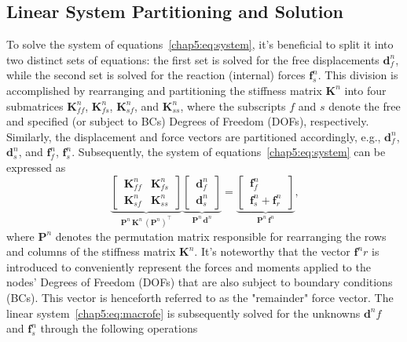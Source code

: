 \subsection{Linear System Partitioning and Solution}

To solve the system of equations~\eqref{chap5:eq:system}, it's beneficial to split it into two distinct sets of equations: the first set is solved for the free displacements $\mathbf{d}^{n}_{f}$, while the second set is solved for the reaction (internal) forces $\mathbf{f}^{n}_{s}$. This division is accomplished by rearranging and partitioning the stiffness matrix $\mathbf{K}^{n}$ into four submatrices $\mathbf{K}^{n}_{ff}$, $\mathbf{K}^{n}_{fs}$, $\mathbf{K}^{n}_{sf}$, and $\mathbf{K}^{n}_{ss}$, where the subscripts $f$ and $s$ denote the free and specified (or subject to \acp{BC}) Degrees of Freedom (\acp{DOF}), respectively. Similarly, the displacement and force vectors are partitioned accordingly, e.g., $\mathbf{d}^{n}_{f}$, $\mathbf{d}^{n}_{s}$, and $\mathbf{f}^{n}_{f}$, $\mathbf{f}^{n}_{s}$. Subsequently, the system of equations~\eqref{chap5:eq:system} can be expressed as
%
\begin{equation}
    \label{chap5:eq:macrofe}
    \underbrace{\left[\,\begin{matrix}
      \mathbf{K}^{n}_{ff} & \mathbf{K}^{n}_{fs} \\[0.5em]
      \mathbf{K}^{n}_{sf} & \mathbf{K}^{n}_{ss}
    \end{matrix}\,\right]}_{\displaystyle \mathbf{P}^{n} \, \mathbf{K}^{n} \, (\mathbf{P}^{n})^\top} \underbrace{\left[\,\begin{matrix}
      \mathbf{d}^{n}_{f} \\[0.5em]
      \mathbf{d}^{n}_{s}
    \end{matrix}\,\right]}_{\displaystyle \mathbf{P}^{n} \, \mathbf{d}^{n}} = \underbrace{\left[\,\begin{matrix}
      \mathbf{f}^{n}_{f} \\[0.5em]
      \mathbf{f}^{n}_{s} + \mathbf{f}^{n}_{r}
    \end{matrix}\,\right]}_{\displaystyle \mathbf{P}^{n} \, \mathbf{f}^{n}} \text{,}
\end{equation}
%
where $\mathbf{P}^{n}$ denotes the permutation matrix responsible for rearranging the rows and columns of the stiffness matrix $\mathbf{K}^{n}$. It's noteworthy that the vector $\mathbf{f}^{n}{r}$ is introduced to conveniently represent the forces and moments applied to the nodes' Degrees of Freedom (\acp{DOF}) that are also subject to boundary conditions (\acp{BC}). This vector is henceforth referred to as the "remainder" force vector. The linear system~\eqref{chap5:eq:macrofe} is subsequently solved for the unknowns $\mathbf{d}^{n}{f}$ and $\mathbf{f}^{n}_{s}$ through the following operations
